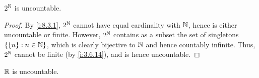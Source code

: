 \begin{cor}\label{i:8.3.3}
  \(2^{\mathbb{N}}\) is uncountable.
\end{cor}

\begin{proof}
  By \cref{i:8.3.1}, \(2^{\mathbb{N}}\) cannot have equal cardinality with \(\mathbb{N}\), hence is either uncountable or finite.
  However, \(2^{\mathbb{N}}\) contains as a subset the set of singletons \(\left\lbrace\left\lbrace n\right\rbrace : n \in \mathbb{N}\right\rbrace\), which is clearly bijective to \(\mathbb{N}\) and hence countably infinite.
  Thus, \(2^{\mathbb{N}}\) cannot be finite (by \cref{i:3.6.14}), and is hence uncountable.
\end{proof}

\begin{cor}\label{i:8.3.4}
  \(\mathbb{R}\) is uncountable.
\end{cor}

